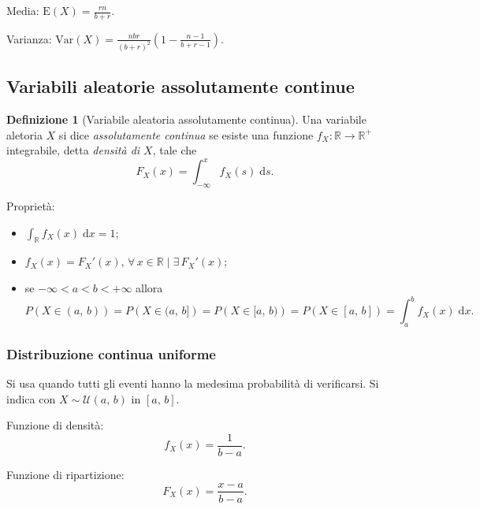 \documentclass{article}
\theoremstyle{definition}
\newtheorem{definizione}{Definizione}
\newcommand{\R}{\mathbb{R}}
\newcommand{\E}{\text{E}}
\newcommand{\Var}{\text{Var}}
\begin{document}
                Media: \(\E(X) = \frac{rn}{b+r}\).

                Varianza: \(\Var(X) = \frac{nbr}{{(b+r)}^2} \left(1-\frac{n-1}{b+r-1}\right)\).

        \subsection{Variabili aleatorie assolutamente continue}

            \begin{definizione}[Variabile aleatoria assolutamente continua]
                Una variabile aletoria \(X\) si dice \emph{assolutamente continua} se esiste una funzione \(f_X : \R \to \R^+\)
                integrabile, detta \emph{densità di \(X\)}, tale che
                \[
                    F_X (x) = \int_{-\infty}^x \! f_X (s) \; \mathrm{d}s.
                \]
            \end{definizione}

            Proprietà:
            \begin{itemize}
                \item \(\int_\R f_X (x) \; \mathrm{d}x = 1\);
                \item \(f_X (x) = F_X' (x)\), \(\forall \, x \in \R \; | \; \exists \, F_X' (x)\);
                \item se \(-\infty < a < b < +\infty\) allora
                    \[
                        P \left(X \in (a, \, b)\right) = P \left(X \in (a, \, b]\right) = P \left(X \in [a, \, b)\right)
                        = P \left(X \in [a, \, b]\right) = \int_a^b \! f_X (x) \; \mathrm{d}x.
                    \]
            \end{itemize}

            \subsubsection{Distribuzione continua uniforme}

                Si usa quando tutti gli eventi hanno la medesima probabilità di verificarsi. Si indica con \(X \sim \mathcal{U}(a, \, b)\)
                in \(\left[a, \, b\right]\).

                Funzione di densità:
                \[
                    f_X (x) = \frac{1}{b - a}.
                \]

                Funzione di ripartizione:
                \[
                    F_X (x) = \frac{x - a}{b - a}.
                \]
\end{document}
